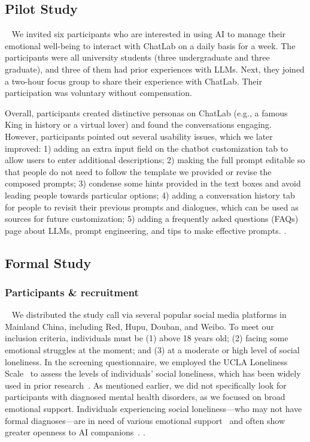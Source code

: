 \subsection{Pilot Study}~\label{pilot}
We invited six participants who are interested in using AI to manage their emotional well-being to interact with ChatLab on a daily basis for a week.
The participants were all university students (three undergraduate and three graduate), and three of them had prior experiences with LLMs.
Next, they joined a two-hour focus group to share their experience with ChatLab. Their participation was voluntary without compensation.

Overall, participants created distinctive personas on ChatLab (e.g., a famous King in history or a virtual lover) and found the conversations engaging. However, participants pointed out several usability issues, which we later improved: 1) adding an extra input field on the chatbot customization tab to allow users to enter additional descriptions; 2) making the full prompt editable so that people do not need to follow the template we provided or revise the composed prompts; 3) condense some hints provided in the text boxes and avoid leading people towards particular options; 4) adding a conversation history tab for people to revisit their previous prompts and dialogues, which can be used as sources for future customization; 5) adding a frequently asked questions (FAQs) page about LLMs, prompt engineering, and tips to make effective prompts.
.


\subsection{Formal Study}
\subsubsection{Participants \& recruitment}~\label{participants}
We distributed the study call via several popular social media platforms in Mainland China, including Red, Hupu, Douban, and Weibo. To meet our inclusion criteria, individuals must be (1) above 18 years old; (2) facing some emotional struggles at the moment; and (3) at a moderate or high level of social loneliness.
In the screening questionnaire, we employed the UCLA Loneliness Scale~\cite{UCLA@Russell1978} to assess the levels of individuals' social loneliness, which has been widely used in prior research~\cite{KILLGORE2020loneliness, Aydin2021loneliness, Jamil2023loneliness}.
As mentioned earlier, we did not specifically look for participants with diagnosed mental health disorders, as we focused on broad emotional support.
Individuals experiencing social loneliness---who may not have formal diagnoses---are in need of various emotional support~\cite{wang2018associations} and often show greater openness to AI companions~\cite{crawford2024artificial}.
.

